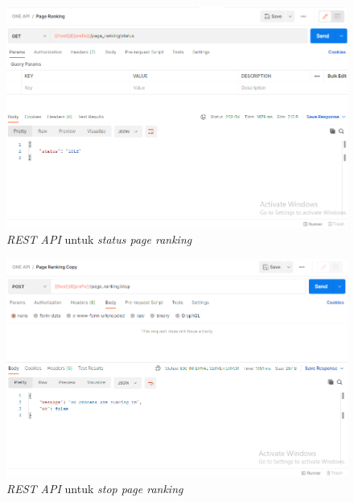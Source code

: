 \begin{figure}[H]
	\centering
	\includegraphics[keepaspectratio, width=13cm]{gambar/rest_page_ranking_status.png}
	\caption{\textit{REST API} untuk \textit{status page ranking}}
	\label{gambar:rest_page_ranking_status.png}
\end{figure}


\begin{figure}[H]
	\centering
	\includegraphics[keepaspectratio, width=13cm]{gambar/rest_page_ranking_stop.png}
	\caption{\textit{REST API} untuk \textit{stop page ranking}}
	\label{gambar:rest_page_ranking_stop.png}
\end{figure}


